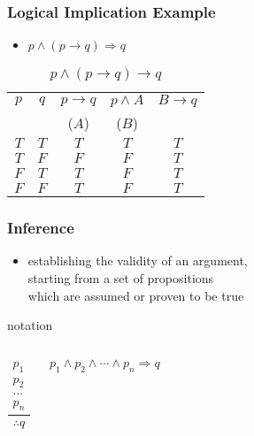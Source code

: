 \documentclass[dvipsnames]{beamer}
\begin{document}
\begin{frame}
  \frametitle{Logical Implication Example}

  \begin{example}
    \begin{itemize}
      \item $p \wedge (p \rightarrow q) \Rightarrow q$
    \end{itemize}

    \begin{table}
      \caption{$p \wedge (p \rightarrow q) \rightarrow q$}
      \begin{tabular}{|c|c|c|c||c|}\hline
        $p$ & $q$ & $p \rightarrow q$ & $p \wedge A$ & $B \rightarrow q$\\
            &     & ($A$)             & ($B$)        &\\\hline\hline
        $T$ & $T$ & $T$ & $T$ & $T$\\\hline
        $T$ & $F$ & $F$ & $F$ & $T$\\\hline
        $F$ & $T$ & $T$ & $F$ & $T$\\\hline
        $F$ & $F$ & $T$ & $F$ & $T$\\\hline
      \end{tabular}
    \end{table}
  \end{example}
\end{frame}

\begin{frame}
  \frametitle{Inference}

  \begin{itemize}
    \item establishing the validity of an argument,\\
      starting from a set of propositions\\
      which are assumed or proven to be true
  \end{itemize}

  \pause
  \begin{block}{notation}
    \begin{columns}
      \[
      \frac
        {
          \begin{array}{c}
            p_1\\
            p_2\\
            \dots\\
            p_n
          \end{array}
        }
        {
          \therefore q
        }
      \]

      $p_1 \wedge p_2 \wedge \cdots \wedge p_n \Rightarrow q$
    \end{columns}
  \end{block}
\end{frame}
\end{document}
